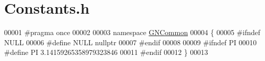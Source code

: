 \hypertarget{_constants_8h_source}{}\section{Constants.\+h}
\label{_constants_8h_source}

\begin{DoxyCode}
00001 \textcolor{preprocessor}{#pragma once}
00002 
00003 \textcolor{keyword}{namespace }\mbox{\hyperlink{namespace_g_n_common}{GNCommon}}
00004 \{
00005 \textcolor{preprocessor}{#ifndef NULL}
00006 \textcolor{preprocessor}{#define NULL nullptr}
00007 \textcolor{preprocessor}{#endif}
00008 
00009 \textcolor{preprocessor}{#ifndef PI}
00010 \textcolor{preprocessor}{#define PI 3.14159265358979323846}
00011 \textcolor{preprocessor}{#endif}
00012 \}
00013 
\end{DoxyCode}
